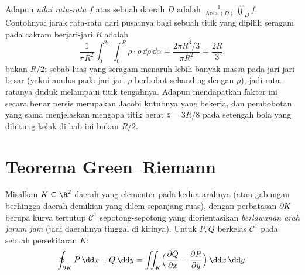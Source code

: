 \begin{example}\label{ex:b2:multint:average}
Adapun \emph{nilai rata-rata} $f$ atas sebuah daerah $D$ adalah
$\frac1{\operatorname{Area}(D)}\iint_Df$. Contohnya: jarak rata-rata
dari pusatnya bagi sebuah titik yang dipilih seragam pada
cakram berjari-jari $R$ adalah
\[
\frac{1}{\pi R^2}\int_0^{2\pi}\!\!\int_0^R
\rho\cdot\rho\,\dd\rho\,\dd\alpha
= \frac{2\pi R^3/3}{\pi R^2} = \frac{2R}3 ,
\]
bukan $R/2$: sebab luas yang seragam menaruh lebih banyak massa pada jari-jari besar (yakni
anulus pada jari-jari $\rho$ berbobot sebanding dengan $\rho$),
jadi rata-ratanya duduk melampaui titik tengahnya. Adapun mendapatkan
faktor ini secara benar persis merupakan Jacobi kutubnya yang bekerja, dan
pembobotan yang sama menjelaskan mengapa titik berat $\bar z = 3R/8$ pada
setengah bola yang dihitung kelak di bab ini bukan $R/2$.
\end{example}

\section{Teorema Green--Riemann}

\begin{theorem}\label{thm:b2:multint:green}
Misalkan $K \subseteq \R^2$ daerah  yang elementer pada
kedua arahnya (atau gabungan berhingga daerah demikian yang dilem sepanjang ruas),
dengan perbatasan $\partial K$ berupa kurva tertutup $\mathcal{C}^1$
sepotong-sepotong yang diorientasikan \emph{berlawanan arah jarum jam} (jadi daerahnya tinggal di
kirinya). Untuk $P, Q$ berkelas $\mathcal{C}^1$ pada sebuah persekitaran
$K$:
\[
\oint_{\partial K} P\,\dd x + Q\,\dd y
= \iint_K \Bigl(\frac{\partial Q}{\partial x}
- \frac{\partial P}{\partial y}\Bigr)\,\dd x\,\dd y .
\]
\end{theorem}

